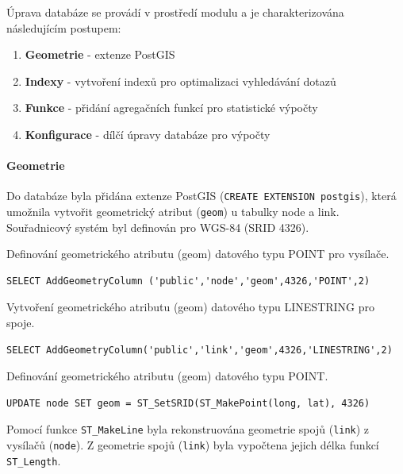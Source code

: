 \documentclass[a4paper,12pt,oneside]{report}
\begin{document}
Úprava databáze se provádí v prostředí modulu a je charakterizována následujícím postupem:
\begin{enumerate}
\item \textbf{Geometrie} - extenze PostGIS
\item \textbf{Indexy} - vytvoření indexů pro optimalizaci vyhledávání dotazů
\item \textbf{Funkce} - přidání agregačních funkcí pro statistické výpočty
\item \textbf{Konfigurace} - dílčí úpravy databáze pro výpočty
\end{enumerate}

\paragraph*{Geometrie} Do databáze byla přidána extenze PostGIS
(\texttt{CREATE EXTENSION post\-gis}), která umožnila vytvořit
geometrický atribut (\texttt{geom}) u tabulky node a
link. Souřad\-nicový systém byl definován pro WGS-84 (SRID 4326).

Definování geometrického atributu (geom) datového typu POINT pro
vysílače.

\begin{footnotesize}
\begin{lstlisting}[style=mybash]
SELECT AddGeometryColumn ('public','node','geom',4326,'POINT',2)
\end{lstlisting}
\end{footnotesize}

Vytvoření geometrického atributu (geom) datového typu LINESTRING pro spoje. 

\begin{footnotesize}
\begin{lstlisting}[style=mybash]
SELECT AddGeometryColumn('public','link','geom',4326,'LINESTRING',2)
\end{lstlisting}
\end{footnotesize}

Definování geometrického atributu (geom) datového typu POINT. 

\begin{footnotesize}
\begin{lstlisting}[style=mybash]
UPDATE node SET geom = ST_SetSRID(ST_MakePoint(long, lat), 4326)
\end{lstlisting}
\end{footnotesize}

Pomocí funkce \texttt{ST\_MakeLine} byla rekonstruována geometrie
spojů (\texttt{link}) z vysí\-lačů (\texttt{node}). Z geometrie spojů
(\texttt{link}) byla vypočtena jejich délka funkcí
\texttt{ST\_Length}.
\end{document}
